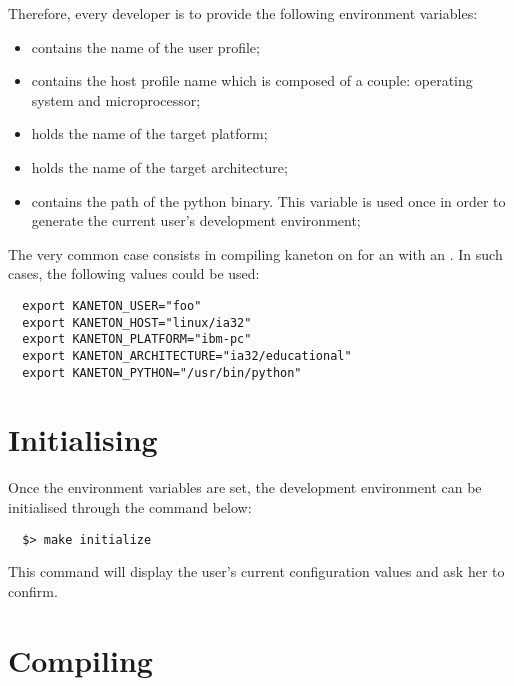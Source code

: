 Therefore, every developer is to provide the following  environment
variables:

\begin{itemize}
  \item
     contains the name of the user profile;
  \item
     contains the host profile name which is
    composed of a couple: operating system and microprocessor;
  \item
     holds the name of the target platform;
  \item
     holds the name of the target
    architecture;
  \item
     contains the path of the python binary. This
    variable is used once in order to generate the current user's development
    environment;
\end{itemize}

The very common case consists in compiling kaneton on for an 
with an . In such cases, the following values
could be used:

\begin{verbatim}
  export KANETON_USER="foo"
  export KANETON_HOST="linux/ia32"
  export KANETON_PLATFORM="ibm-pc"
  export KANETON_ARCHITECTURE="ia32/educational"
  export KANETON_PYTHON="/usr/bin/python"
\end{verbatim}

%
%

\section{Initialising}

Once the  environment variables are set, the development environment
can be initialised through the command below:

\begin{verbatim}
  $> make initialize
\end{verbatim}

This command will display the user's current configuration values and ask
her to confirm.

%
%

\section{Compiling}

